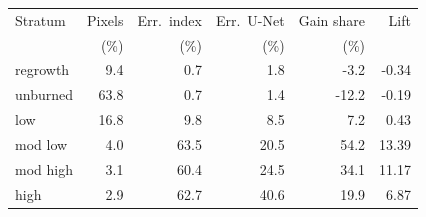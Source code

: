 \begin{tabular}{@{}lrrrrr@{}}
\toprule
Stratum & Pixels & Err.\ index & Err.\ U-Net & Gain share & Lift \\
 & (\%) & (\%) & (\%) & (\%) & \\
\midrule
regrowth & 9.4 & 0.7 & 1.8 & -3.2 & -0.34 \\
unburned & 63.8 & 0.7 & 1.4 & -12.2 & -0.19 \\
low & 16.8 & 9.8 & 8.5 & 7.2 & 0.43 \\
mod low & 4.0 & 63.5 & 20.5 & 54.2 & 13.39 \\
mod high & 3.1 & 60.4 & 24.5 & 34.1 & 11.17 \\
high & 2.9 & 62.7 & 40.6 & 19.9 & 6.87 \\
\bottomrule
\end{tabular}
